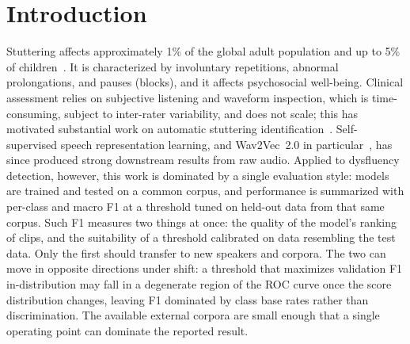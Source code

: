 \documentclass[a4paper,orivec]{llncs}
\begin{document}
\section{Introduction}
\label{sec:intro}
Stuttering affects approximately 1\% of the global adult population and up to
5\% of children~\cite{yairi2009childhood}. It is characterized by involuntary
repetitions, abnormal prolongations, and pauses (blocks), and it affects
psychosocial well-being. Clinical assessment relies on subjective listening and
waveform inspection, which is time-consuming, subject to inter-rater variability,
and does not scale; this has motivated substantial work on automatic stuttering
identification~\cite{sheikh2022review}. Self-supervised speech representation
learning, and Wav2Vec~2.0 in particular~\cite{baevski2020wav2vec}, has since
produced strong downstream results from raw audio. Applied to dysfluency
detection, however, this work is dominated by a single evaluation style: models
are trained and tested on a common corpus, and performance is summarized with
per-class and macro F1 at a threshold tuned on held-out data from that same
corpus. Such F1 measures two things at once: the quality of the model's ranking of
clips, and the suitability of a threshold calibrated on data resembling the test
data. Only the first should transfer to new speakers and corpora. The two can move
in opposite directions under shift: a threshold that maximizes validation F1
in-distribution may fall in a degenerate region of the ROC curve once the score
distribution changes, leaving F1 dominated by class base rates rather than
discrimination. The available external corpora are small enough that a single
operating point can dominate the reported result.
\end{document}
